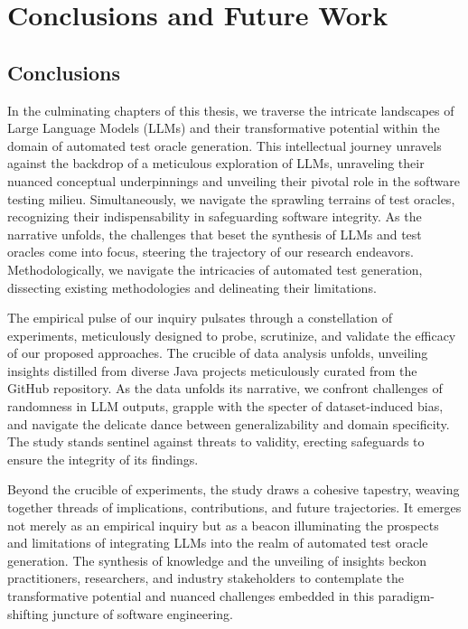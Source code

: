 \chapter{Conclusions and Future Work}
\label{cha:conclusions}
\vspace{0.4 cm}

\section{Conclusions}
\label{sec:conclusions}
\vspace{0.2 cm}

In the culminating chapters of this thesis, we traverse the intricate landscapes of Large Language Models (LLMs) and their transformative potential within the domain of automated test oracle generation. This intellectual journey unravels against the backdrop of a meticulous exploration of LLMs, unraveling their nuanced conceptual underpinnings and unveiling their pivotal role in the software testing milieu. Simultaneously, we navigate the sprawling terrains of test oracles, recognizing their indispensability in safeguarding software integrity. As the narrative unfolds, the challenges that beset the synthesis of LLMs and test oracles come into focus, steering the trajectory of our research endeavors. Methodologically, we navigate the intricacies of automated test generation, dissecting existing methodologies and delineating their limitations.

The empirical pulse of our inquiry pulsates through a constellation of experiments, meticulously designed to probe, scrutinize, and validate the efficacy of our proposed approaches. The crucible of data analysis unfolds, unveiling insights distilled from diverse Java projects meticulously curated from the GitHub repository. As the data unfolds its narrative, we confront challenges of randomness in LLM outputs, grapple with the specter of dataset-induced bias, and navigate the delicate dance between generalizability and domain specificity. The study stands sentinel against threats to validity, erecting safeguards to ensure the integrity of its findings.

Beyond the crucible of experiments, the study draws a cohesive tapestry, weaving together threads of implications, contributions, and future trajectories. It emerges not merely as an empirical inquiry but as a beacon illuminating the prospects and limitations of integrating LLMs into the realm of automated test oracle generation. The synthesis of knowledge and the unveiling of insights beckon practitioners, researchers, and industry stakeholders to contemplate the transformative potential and nuanced challenges embedded in this paradigm-shifting juncture of software engineering.

